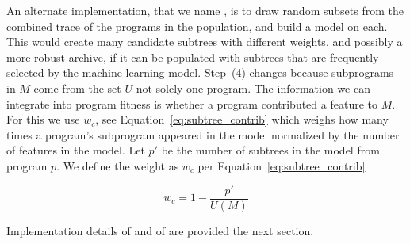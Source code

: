 An alternate implementation, that we name \DRAW,  is to draw random subsets from the combined trace of the programs in the population, and build a model on each.  This would create many candidate subtrees with different weights, and possibly a more robust archive, if it can be populated with subtrees that are frequently selected by the machine learning model.  Step~(4) changes because subprograms in $M$ come from the set $U$ not solely one program. The information we can integrate into program fitness is whether a program contributed a feature to $M$. For this we use $w_c$, see Equation~\ref{eq:subtree_contrib} which weighs how many times a program's subprogram appeared in the model normalized by the number of features in the model. Let $p'$ be the number of subtrees in the model from program $p$.  We define the weight as $w_c$ per Equation~\ref{eq:subtree_contrib}


\begin{equation}
\label{eq:subtree_contrib}
w_c = 1 - \frac{p'}{U(M)}
\end{equation}

Implementation details of \FULL and of \DRAW are provided the next section.  


